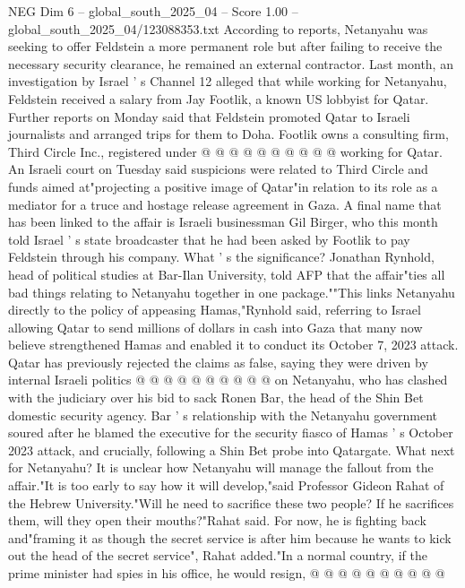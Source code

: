 \begin{textsample}{NEG Dim 6 – global\_south\_2025\_04 – Score 1.00 – global\_south\_2025\_04/123088353.txt}
According to reports, Netanyahu was seeking to offer Feldstein a more permanent role but after failing to receive the necessary security clearance, he remained an external contractor.
Last month, an investigation by Israel ' s Channel 12 alleged that while working for Netanyahu, Feldstein received a salary from Jay Footlik, a known US lobbyist for Qatar.
Further reports on Monday said that Feldstein promoted Qatar to Israeli journalists and arranged trips for them to Doha.
Footlik owns a consulting firm, Third Circle Inc., registered under @ @ @ @ @ @ @ @ @ @ working for Qatar.
An Israeli court on Tuesday said suspicions were related to Third Circle and funds aimed at"projecting a positive image of Qatar"in relation to its role as a mediator for a truce and hostage release agreement in Gaza.
A final name that has been linked to the affair is Israeli businessman Gil Birger, who this month told Israel ' s state broadcaster that he had been asked by Footlik to pay Feldstein through his company.
What ' s the significance?
Jonathan Rynhold, head of political studies at Bar-Ilan University, told AFP that the affair"ties all bad things relating to Netanyahu together in one package.""This links Netanyahu directly to the policy of appeasing Hamas,"Rynhold said, referring to Israel allowing Qatar to send millions of dollars in cash into Gaza that many now believe strengthened Hamas and enabled it to conduct its October 7, 2023 attack.
Qatar has previously rejected the claims as false, saying they were driven by internal Israeli politics @ @ @ @ @ @ @ @ @ @ on Netanyahu, who has clashed with the judiciary over his bid to sack Ronen Bar, the head of the Shin Bet domestic security agency.
Bar ' s relationship with the Netanyahu government soured after he blamed the executive for the security fiasco of Hamas ' s October 2023 attack, and crucially, following a Shin Bet probe into Qatargate.
What next for Netanyahu?
It is unclear how Netanyahu will manage the fallout from the affair."It is too early to say how it will develop,"said Professor Gideon Rahat of the Hebrew University."Will he need to sacrifice these two people?
If he sacrifices them, will they open their mouths?"Rahat said.
For now, he is fighting back and"framing it as though the secret service is after him because he wants to kick out the head of the secret service", Rahat added."In a normal country, if the prime minister had spies in his office, he would resign, @ @ @ @ @ @ @ @ @ @

\end{textsample}
